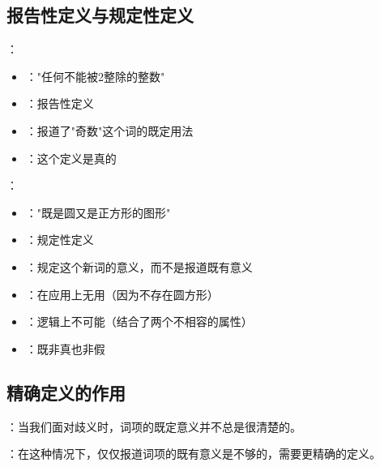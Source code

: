 \subsection{报告性定义与规定性定义}

\begin{examplebox}[title=报告性定义的典型例子]
：
\begin{itemize}
  \item {}："任何不能被2整除的整数"
  \item {}：报告性定义
  \item {}：报道了"奇数"这个词的既定用法
  \item {}：这个定义是真的
\end{itemize}
\end{examplebox}

\begin{examplebox}[title=规定性定义的典型例子]
：
\begin{itemize}
  \item {}："既是圆又是正方形的图形"
  \item {}：规定性定义
  \item {}：规定这个新词的意义，而不是报道既有意义
  \item {}：在应用上无用（因为不存在圆方形）
  \item {}：逻辑上不可能（结合了两个不相容的属性）
  \item {}：既非真也非假
\end{itemize}
\end{examplebox}

\subsection{精确定义的作用}

\begin{theorembox}[title=精确定义的必要性]
：当我们面对歧义时，词项的既定意义并不总是很清楚的。

：在这种情况下，仅仅报道词项的既有意义是不够的，需要更精确的定义。
\end{theorembox}

